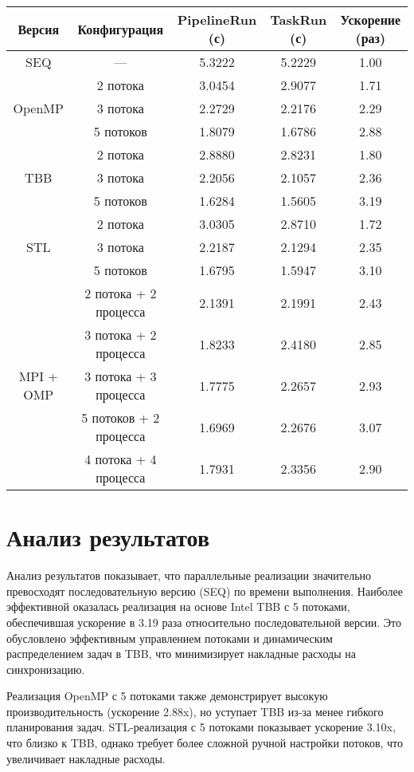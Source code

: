 \documentclass[a4paper,12pt]{article}
\begin{document}
\begin{center}
\begin{tabular}{|c|c|c|c|c|}
\hline
\textbf{Версия} & \textbf{Конфигурация} & \textbf{PipelineRun (с)} & \textbf{TaskRun (с)} & \textbf{Ускорение (раз)} \\
\hline
SEQ & — & 5.3222 & 5.2229 & 1.00 \\
\hline
\multirow{3}{*}{OpenMP} 
 & 2 потока & 3.0454 & 2.9077 & 1.71 \\
 & 3 потока & 2.2729 & 2.2176 & 2.29 \\
 & 5 потоков & 1.8079 & 1.6786 & 2.88 \\
\hline
\multirow{3}{*}{TBB} 
 & 2 потока & 2.8880 & 2.8231 & 1.80 \\
 & 3 потока & 2.2056 & 2.1057 & 2.36 \\
 & 5 потоков & 1.6284 & 1.5605 & 3.19 \\
\hline
\multirow{3}{*}{STL} 
 & 2 потока & 3.0305 & 2.8710 & 1.72 \\
 & 3 потока & 2.2187 & 2.1294 & 2.35 \\
 & 5 потоков & 1.6795 & 1.5947 & 3.10 \\
\hline
\multirow{5}{*}{MPI + OMP} 
 & 2 потока + 2 процесса & 2.1391 & 2.1991 & 2.43 \\
 & 3 потока + 2 процесса & 1.8233 & 2.4180 & 2.85 \\
 & 3 потока + 3 процесса & 1.7775 & 2.2657 & 2.93 \\
 & 5 потоков + 2 процесса & 1.6969 & 2.2676 & 3.07 \\
 & 4 потока + 4 процесса & 1.7931 & 2.3356 & 2.90 \\
\hline
\end{tabular}
\end{center}

\section*{Анализ результатов}
Анализ результатов показывает, что параллельные реализации значительно превосходят последовательную версию (SEQ) по времени выполнения. Наиболее эффективной оказалась реализация на основе Intel TBB с 5 потоками, обеспечившая ускорение в 3.19 раза относительно последовательной версии. Это обусловлено эффективным управлением потоками и динамическим распределением задач в TBB, что минимизирует накладные расходы на синхронизацию.

Реализация OpenMP с 5 потоками также демонстрирует высокую производительность (ускорение 2.88x), но уступает TBB из-за менее гибкого планирования задач. STL-реализация с 5 потоками показывает ускорение 3.10x, что близко к TBB, однако требует более сложной ручной настройки потоков, что увеличивает накладные расходы.
\end{document}
